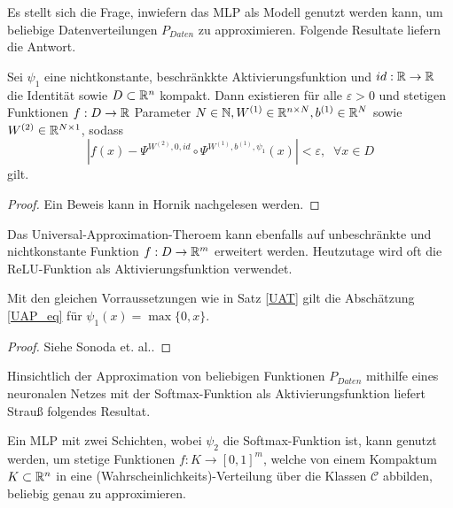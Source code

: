 Es stellt sich die Frage, inwiefern das MLP als Modell genutzt werden kann, um beliebige Datenverteilungen $P_{Daten}$ zu approximieren. Folgende Resultate liefern die Antwort.

\begin{satz}
    \label{UAT}
    Sei $\psi_1$ eine nichtkonstante, beschränkkte Aktivierungsfunktion und $id: \mathbb{R} \rightarrow \mathbb{R}$ die Identität sowie $D \subset \mathbb{R}^n$ kompakt. Dann existieren für alle $\varepsilon >0$ und stetigen Funktionen $f: D \rightarrow \mathbb{R}$ Parameter $N \in \mathbb{N}, W^{(1)} \in \mathbb{R}^{n \times N}, b^{(1)} \in \mathbb{R}^N$ sowie $W^{(2)} \in \mathbb{R}^{N \times 1}$, sodass
    \begin{equation}
        \label{UAP_eq}
        \left|f(x)-\Psi^{W^{(2)},0,id} \circ \Psi^{W^{(1)},b^{(1)},\psi_1}(x)\right| < \varepsilon, \; \; \forall x \in D
    \end{equation}
    gilt.
\end{satz}

\begin{proof}
    Ein Beweis kann in Hornik\cite{hornik1991approximation} nachgelesen werden.
\end{proof}

Das Universal-Approximation-Theroem kann ebenfalls auf unbeschränkte und nichtkonstante Funktion $f:D \rightarrow \mathbb{R}^m$ erweitert werden. Heutzutage wird oft die ReLU-Funktion als Aktivierungsfunktion verwendet\cite{schmidt2020nonparametric,li2017convergence}.

\begin{kor}
    Mit den gleichen Vorraussetzungen wie in Satz \ref{UAT} gilt die Abschätzung \ref{UAP_eq} für $\psi_1(x)=\max\{0,x\}$.
\end{kor}

\begin{proof}
    Siehe Sonoda et. al.\cite{sonoda2017neural}.
\end{proof}

Hinsichtlich der Approximation von beliebigen Funktionen $P_{Daten}$ mithilfe eines neuronalen Netzes mit der Softmax-Funktion als Aktivierungsfunktion liefert Strauß\cite{strauss} folgendes Resultat.

\begin{kor}
    \label{kor_softmax}
    Ein MLP mit zwei Schichten, wobei $\psi_2$ die Softmax-Funktion ist, kann genutzt werden, um stetige Funktionen $f:K \rightarrow [0,1]^m$, welche von einem Kompaktum $K \subset \mathbb{R}^n$ in eine (Wahrscheinlichkeits)-Verteilung über die Klassen $\mathcal{C}$ abbilden, beliebig genau zu approximieren.
\end{kor}

